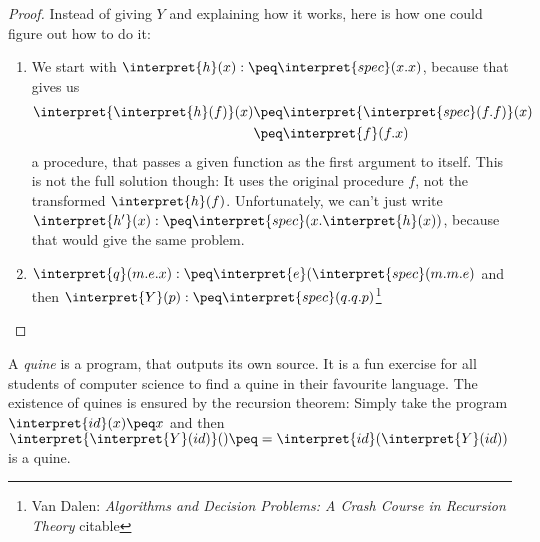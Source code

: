 \begin{proof}
	\TODO {}

	Instead of giving $Y$ and explaining how it works, here is how one could 
	figure out how to do it:

	\begin{enumerate}
		\item We start with $\interpret{h}(x):\peq \interpret{spec}(x.x)$, 
			because that gives us 
			\begin{equation*}
				\begin{split}
					\interpret{\interpret{h}(f)}(x)
					&\peq \interpret{\interpret{spec}(f.f)}(x)\\
					&\peq \interpret{f}(f.x)
				\end{split}
			\end{equation*}
			a procedure, that passes a given function as the first argument to 
			itself. This is not the full solution though: It uses the original 
			procedure $f$, not the transformed $\interpret{h}(f)$. Unfortunately, 
			we can't just write 
			$\interpret{h'}(x):\peq \interpret{spec}(x.\interpret{h}(x))$, because 
			that would give the same problem. 
		\item $\interpret{q}(m.e.x):\peq \interpret{e}(\interpret{spec}(m.m.e)$ 
			and then $\interpret{Y}(p):\peq \interpret{spec}(q.q.p)$\footnote{Van 
				Dalen: {\em Algorithms and Decision Problems: A Crash Course in 
				Recursion Theory} \TODO citable}
	\end{enumerate}
\end{proof}

\begin{example}[Quines]
	A {\em quine} is a program, that outputs its own source. It is a fun 
	exercise for all students of computer science to find a quine in their 
	favourite language. The existence of quines is ensured by the recursion theorem:
	Simply take the program $\interpret{id}(x)\peq x$ and then 
	$\interpret{\interpret{Y}(id)}() \peq = \interpret{id}(\interpret{Y}(id))$ 
	is a quine.
\end{example}

